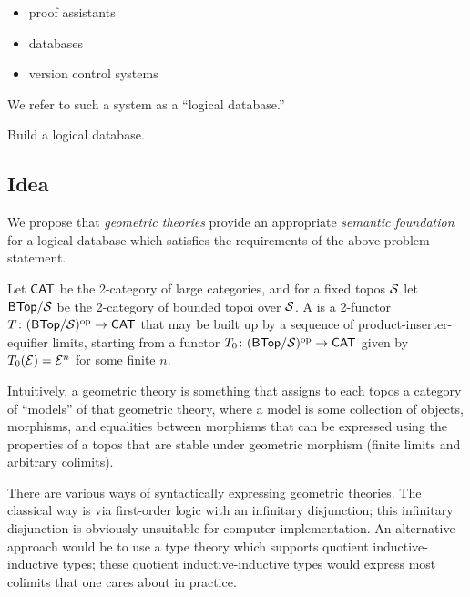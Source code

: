 \documentclass{article}
\begin{document}
\begin{itemize}
\item proof assistants
\item databases
\item version control systems
\end{itemize}
We refer to such a system as a ``logical database.''

\begin{problem}
  Build a logical database.
\end{problem}

\subsection{Idea}
We propose that \emph{geometric theories} provide an appropriate \emph{semantic foundation} for a logical database which satisfies the requirements of the above problem statement.

\begin{definition}
  Let $\mathsf{CAT}$ be the 2-category of large categories, and for a fixed topos $\mathcal{S}$ let $\mathsf{BTop}/\mathcal{S}$ be the 2-category of bounded topoi over $\mathcal{S}$.
  A  is a 2-functor $T \colon (\mathsf{BTop}/\mathcal{S})^\mathrm{op} \to \mathsf{CAT}$ that may be built up by a sequence of product-inserter-equifier limits, starting from a functor $T_0 \colon (\mathsf{BTop}/\mathcal{S})^\mathrm{op} \to \mathsf{CAT}$ given by $T_0(\mathcal{E}) = \mathcal{E}^n$ for some finite $n$.
\end{definition}

Intuitively, a geometric theory is something that assigns to each topos a category of ``models'' of that geometric theory, where a model is some collection of objects, morphisms, and equalities between morphisms that can be expressed using the properties of a topos that are stable under geometric morphism (finite limits and arbitrary colimits).

There are various ways of syntactically expressing geometric theories. The classical way is via first-order logic with an infinitary disjunction; this infinitary disjunction is obviously unsuitable for computer implementation. An alternative approach would be to use a type theory which supports quotient inductive-inductive types; these quotient inductive-inductive types would express most colimits that one cares about in practice.
\end{document}
